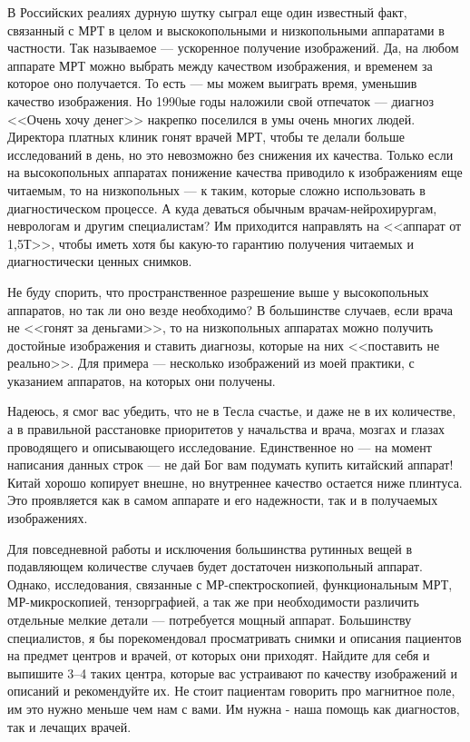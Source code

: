 В Российских реалиях дурную шутку сыграл еще один известный факт, связанный с МРТ в целом и выскокопольными и низкопольными аппаратами в частности. Так называемое --- ускоренное получение изображений. Да, на любом аппарате МРТ можно выбрать между качеством изображения, и временем за которое оно получается. То есть --- мы можем выиграть время, уменьшив качество изображения. Но 1990ые годы наложили свой отпечаток --- диагноз <<Очень хочу денег>> накрепко поселился в умы очень многих людей. Директора платных клиник гонят врачей МРТ, чтобы те делали больше исследований в день, но это невозможно без снижения их качества. Только если на высокопольных аппаратах понижение качества приводило к изображениям еще читаемым, то на низкопольных --- к таким, которые сложно использовать в диагностическом процессе. А куда деваться обычным врачам-нейрохирургам, неврологам и другим специалистам? Им приходится направлять на <<аппарат от 1,5Т>>, чтобы иметь хотя бы какую-то гарантию получения читаемых и диагностически ценных снимков. 

Не буду спорить, что пространственное разрешение выше у высокопольных аппаратов, но так ли оно везде необходимо? В большинстве случаев, если врача не <<гонят за деньгами>>, то на низкопольных аппаратах можно получить достойные изображения и ставить диагнозы, которые на них <<поставить не реально>>. Для примера --- несколько изображений из моей практики, с указанием аппаратов, на которых они получены.


Надеюсь, я смог вас убедить, что не в Тесла счастье, и даже не в их количестве, а в правильной расстановке приоритетов у начальства и врача, мозгах и глазах проводящего и описывающего исследование. Единственное но --- на момент написания данных строк --- не дай Бог вам подумать купить китайский аппарат! Китай хорошо копирует внешне, но внутреннее качество остается ниже плинтуса. Это проявляется как в самом аппарате и его надежности, так и в получаемых изображениях.

Для повседневной работы и исключения большинства рутинных вещей в подавляющем количестве случаев будет достаточен низкопольный аппарат. Однако, исследования, связанные с МР-спектроскопией, функциональным МРТ, МР-микроскопией, тензорграфией, а так же при необходимости различить отдельные мелкие детали --- потребуется мощный аппарат. Большинству специалистов, я бы порекомендовал просматривать снимки и описания пациентов на предмет центров и врачей, от которых они приходят. Найдите для себя и выпишите 3--4 таких центра, которые вас устраивают по качеству изображений и описаний и рекомендуйте их. Не стоит пациентам говорить про магнитное поле, им это нужно меньше чем нам с вами. Им нужна - наша помощь как диагностов, так и лечащих врачей.

